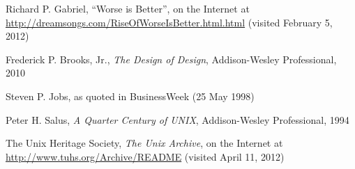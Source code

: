 \begin{thebibliography}{99}
Richard P. Gabriel, ``Worse is Better'',
on the Internet at
\url{http://dreamsongs.com/RiseOfWorseIsBetter.html.html} (visited February 5,
2012)

Frederick P. Brooks, Jr., {\em The Design of
Design}, Addison-Wesley Professional, 2010

Steven P. Jobs, as quoted in BusinessWeek (25 May 1998)

Peter H. Salus, {\em A Quarter Century of UNIX},
Addison-Wesley Professional, 1994

The Unix Heritage Society, {\em The Unix Archive},
on the Internet at
\url{http://www.tuhs.org/Archive/README} (visited April 11, 2012)

\end{thebibliography}
